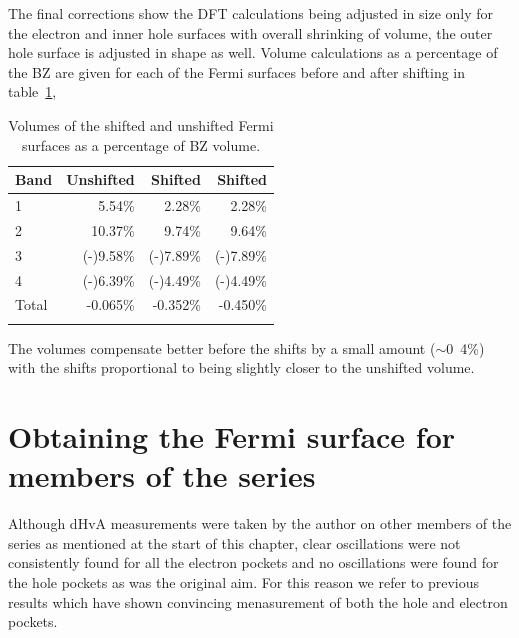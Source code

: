The final corrections show the \ac{DFT} calculations being adjusted in size only for the electron and inner hole surfaces with overall shrinking of volume, the outer hole surface is adjusted in shape as well. Volume calculations as a percentage of the \ac{BZ} are given for each of the Fermi surfaces before and after shifting in table~\ref{Table:ResD:FermiSurfaceVolumes},
\begin{table}
    \begin{center}
           \caption{Volumes of the shifted and unshifted Fermi surfaces as a percentage of \ac{BZ} volume.}
        \begin{tabular}[htbp]{lrrr}
\toprule
Band    & Unshifted    & Shifted \DzTwo{}    & Shifted \DxzDyz{} \\
\midrule
1  & 5.54\%    & 2.28\%    & 2.28\%    \\
2  & 10.37\%   & 9.74\%    & 9.64\%    \\
3  & (-)9.58\% & (-)7.89\% & (-)7.89\% \\
4  & (-)6.39\% & (-)4.49\% & (-)4.49\% \\
\midrule
Total & -0.065\%    & -0.352\%  & -0.450\%  \\
\bottomrule
        \label{Table:ResD:FermiSurfaceVolumes}
        \end{tabular}
    \end{center}
\end{table}
The volumes compensate better before the shifts by a small amount ($\sim$\unit{0.4}{\%}) with the shifts proportional to \DxzDyz{} being slightly closer to the unshifted volume.

\section{Obtaining the Fermi surface for members of the \BaFeAsP{} series}

Although \ac{dHvA} measurements were taken by the author on other members of the \BaFeAsP{} series as mentioned at the start of this chapter, clear oscillations were not consistently found for all the electron pockets and no oscillations were found for the hole pockets as was the original aim. For this reason we refer to previous results which have shown convincing menasurement of both the hole and electron pockets.

